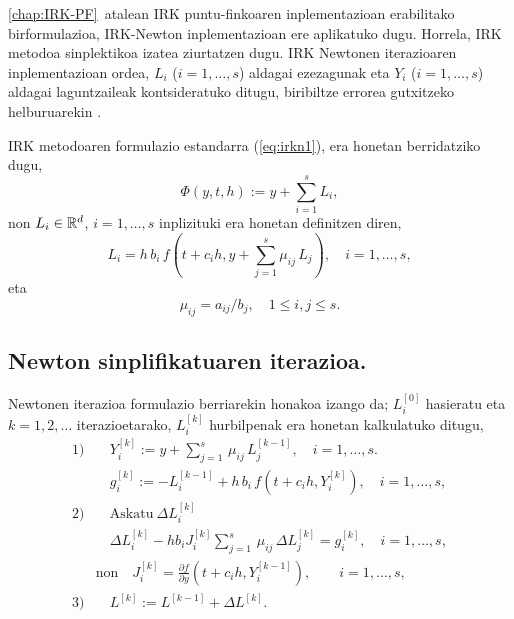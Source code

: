 \ref{chap:IRK-PF}~atalean IRK puntu-finkoaren inplementazioan erabilitako  birformulazioa, IRK-Newton inplementazioan ere aplikatuko dugu. Horrela, IRK metodoa sinplektikoa izatea ziurtatzen dugu. IRK Newtonen iterazioaren inplementazioan ordea, $L_i$ ($i=1,\dots,s$) aldagai ezezagunak eta $Y_i$ ($i=1,\dots,s$) aldagai laguntzaileak kontsideratuko ditugu, biribiltze errorea gutxitzeko helburuarekin \cite{Olsson2000}.

IRK metodoaren formulazio estandarra (\ref{eq:irkn1}), era honetan berridatziko dugu,
\begin{equation}
\label{eq:PhiIRK2}
\Phi(y,t,h) :=y + \sum_{i=1}^s L_{i},
\end{equation}
%
non $L_{i} \in \mathbb{R}^d$, $i=1,\ldots,s$ inplizituki era honetan definitzen diren,
%
\begin{equation}
\label{eq:L}
 L_{i} = h \, b_i \, f(t+c_i h, y+ \sum_{j=1}^s \mu_{ij}\,L_{j}), \quad  i=1 ,\ldots, s, 
\end{equation}
%
eta
%
\begin{equation*} 
\mu_{ij}=a_{ij}/b_j,  \quad 1 \leq i,j \leq s.
\end{equation*}
%
\subsection*{Newton sinplifikatuaren iterazioa.}

Newtonen iterazioa formulazio berriarekin honakoa izango da; $L_i^{[0]}$ hasieratu eta  $k=1,2,\dots$ iterazioetarako, $L_i^{[k]}$ hurbilpenak era honetan kalkulatuko ditugu,
\begin{equation}
\label{eq:Newton_iteration2}
\begin{split}
1) 
   & \quad Y_i^{[k]} := y+\sum_{j=1}^{s}\, \mu_{ij}\, L_{j}^{[k-1]}, \quad  i=1 ,\ldots, s. \\
   & \quad g_i^{[k]} := -L_{i}^{[k-1]}  + h \, b_i\, f(t+c_i h,  Y_i^{[k]}), \quad  i=1 ,\ldots, s, \\   
2) & \quad \mathrm{Askatu \ } \Delta L_{i}^{[k]}  \\
   & \quad \Delta L_{i}^{[k]}  - h b_i J_i^{[k]} \sum_{j=1}^{s}\, \mu_{ij} \, \Delta L_{j}^{[k]}=g_i^{[k]}, \quad  i=1 ,\ldots, s,  \\
& \mbox{non} \quad  J_i^{[k]}=\frac{\partial f}{\partial y}(t + c_i h,Y_{i}^{[k-1]}),\quad \quad  i=1,\ldots, s,  \\
3) 
   & \quad   L^{[k]} := L^{[k-1]}  + \Delta L^{[k]}.
   \end{split}
\end{equation}

